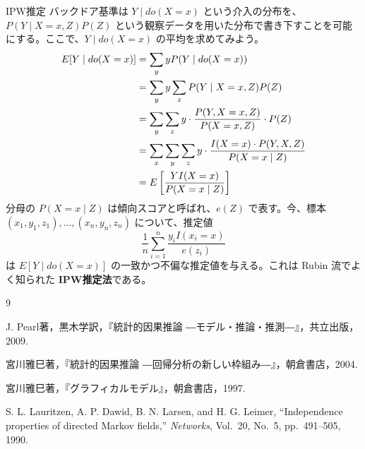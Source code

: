 \documentclass[uplatex, dvipdfmx]{jsarticle}
\begin{document}
\begin{exm}{IPW推定}
  バックドア基準は $Y \mid do(X=x)$ という介入の分布を、$P(Y \mid X=x, Z)P(Z)$ という観察データを用いた分布で書き下すことを可能にする。ここで、$Y \mid do(X=x)$ の平均を求めてみよう。
  \begin{align}
    E[Y \mid do(X=x)] &= \sum_y y P(Y \mid do(X=x)) \notag \\
    &= \sum_y y \sum_z P(Y \mid X=x, Z) P(Z) \notag \\
    &= \sum_y \sum_z y \cdot \frac{P(Y, X=x, Z)}{P(X=x, Z)} \cdot P(Z) \notag \\
    &= \sum_x \sum_y \sum_z y \cdot \frac{I(X=x) \cdot P(Y, X, Z)}{P(X=x \mid Z)} \notag \\
    &= E\left[ \frac{Y I(X=x)}{P(X=x \mid Z)} \right]
  \end{align}
  分母の $P(X=x \mid Z)$ は傾向スコアと呼ばれ、$e(Z)$ で表す。今、標本 $(x_1, y_1, z_1), \dots, (x_n, y_n, z_n)$ について、推定値
  \begin{equation}
    \frac{1}{n} \sum_{i=1}^n \frac{y_i I(x_i=x)}{e(z_i)}
  \end{equation}
  は $E[Y \mid do(X=x)]$ の一致かつ不偏な推定値を与える。これは Rubin 流でよく知られた \textbf{IPW推定法}である。
\end{exm}

\newpage
\begin{thebibliography}{9}

J. Pearl著，黒木学訳，『統計的因果推論 ―モデル・推論・推測―』，共立出版，2009.

宮川雅巳著，『統計的因果推論 ―回帰分析の新しい枠組み―』，朝倉書店，2004.

宮川雅巳著，『グラフィカルモデル』，朝倉書店，1997.

S. L. Lauritzen, A. P. Dawid, B. N. Larsen, and H. G. Leimer, ``Independence properties of directed Markov fields,'' \textit{Networks}, Vol.~20, No.~5, pp.~491--505, 1990.

\end{thebibliography}
\end{document}
